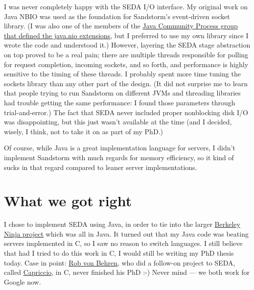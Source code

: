\documentclass[a4paper,12pt,notitlepage,twoside,openright]{article}
\begin{document}
I was never completely happy with the SEDA I/O interface. My original work on Java NBIO was used as the foundation for Sandstorm's event-driven socket library. (I was also one of the members of the \href{http://jcp.org/en/jsr/detail?id=51}{Java Community Process group that defined the java.nio extensions}, but I preferred to use my own library since I wrote the code and understood it.) However, layering the SEDA stage abstraction on top proved to be a real pain; there are multiple threads responsible for polling for request completion, incoming sockets, and so forth, and performance is highly sensitive to the timing of these threads. I probably spent more time tuning the sockets library than any other part of the design. (It did not surprise me to learn that people trying to run Sandstorm on different JVMs and threading libraries had trouble getting the same performance: I found those parameters through trial-and-error.) The fact that SEDA never included proper nonblocking disk I/O was disappointing, but this just wasn't available at the time (and I decided, wisely, I think, not to take it on as part of my PhD.)

Of course, while Java is a great implementation language for servers, I didn't implement Sandstorm with much regards for memory efficiency, so it kind of sucks in that regard compared to leaner server implementations.

\section{What we got right}

I chose to implement SEDA using Java, in order to tie into the larger \href{http://web.archive.org/web/20010302132216/http://ninja.cs.berkeley.edu/}{Berkeley Ninja project} which was all in Java. It turned out that my Java code was beating servers implemented in C, so I saw no reason to switch languages. I still believe that had I tried to do this work in C, I would still be writing my PhD thesis today. Case in point: \href{http://web.archive.org/web/20070609100703/www.cs.berkeley.edu/~jrvb/}{Rob von Behren}, who did a follow-on project to SEDA, called \href{http://capriccio.cs.berkeley.edu/publications.html}{Capriccio}, in C, never finished his PhD :-) Never mind --- we both work for Google now.
\end{document}
